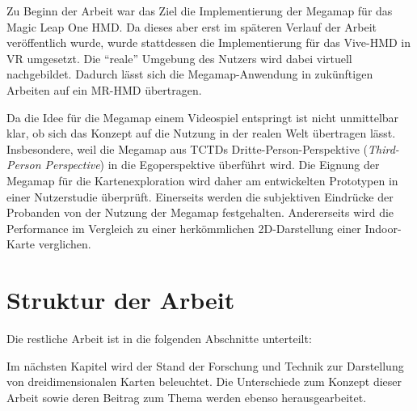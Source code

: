 Zu Beginn der Arbeit war das Ziel die Implementierung der Megamap für das Magic Leap One HMD.
Da dieses aber erst im späteren Verlauf der Arbeit veröffentlich wurde, wurde stattdessen die Implementierung für das Vive-HMD in VR umgesetzt.
Die \enquote{reale} Umgebung des Nutzers wird dabei virtuell nachgebildet.
Dadurch lässt sich die Megamap-Anwendung in zukünftigen Arbeiten auf ein MR-HMD übertragen.



Da die Idee für die Megamap einem Videospiel entspringt ist nicht unmittelbar klar, ob sich das Konzept auf die Nutzung in der realen Welt übertragen lässt.
Insbesondere, weil die Megamap aus TCTDs Dritte-Person-Perspektive (\emph{Third-Person Perspective}) in die Egoperspektive überführt wird.
Die Eignung der Megamap für die Kartenexploration wird daher am entwickelten Prototypen in einer Nutzerstudie überprüft.
Einerseits werden die subjektiven Eindrücke der Probanden von der Nutzung der Megamap festgehalten.
Andererseits wird die Performance im Vergleich zu einer herkömmlichen 2D-Darstellung einer Indoor-Karte verglichen.

\section{Struktur der Arbeit}
\label{sec:struktur}
Die restliche Arbeit ist in die folgenden Abschnitte unterteilt:

Im nächsten Kapitel wird der Stand der Forschung und Technik zur Darstellung von dreidimensionalen Karten beleuchtet.
Die Unterschiede zum Konzept dieser Arbeit sowie deren Beitrag zum Thema werden ebenso herausgearbeitet.

